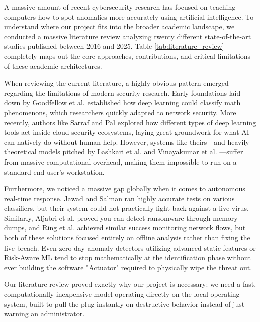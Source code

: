 \documentclass[conference]{IEEEtran}
\begin{document}
A massive amount of recent cybersecurity research has focused on teaching computers how to spot anomalies more accurately using artificial intelligence. To understand where our project fits into the broader academic landscape, we conducted a massive literature review analyzing twenty different state-of-the-art studies published between 2016 and 2025. Table \ref{tab:literature_review} completely maps out the core approaches, contributions, and critical limitations of these academic architectures.

When reviewing the current literature, a highly obvious pattern emerged regarding the limitations of modern security research. Early foundations laid down by Goodfellow et al. \cite{goodfellow2016deep} established how deep learning could classify math phenomenons, which researchers quickly adapted to network security. More recently, authors like Sarraf and Pal \cite{sarraf2025ai} explored how different types of deep learning tools act inside cloud security ecosystems, laying great groundwork for what AI can natively do without human help. However, systems like theirs—and heavily theoretical models pitched by Lashkari et al. \cite{lashkari2022deep} and Vinayakumar et al. \cite{vinayakumar2021deep}—suffer from massive computational overhead, making them impossible to run on a standard end-user's workstation. 

Furthermore, we noticed a massive gap globally when it comes to autonomous real-time response. Jawad and Salman \cite{jawad2024ml} ran highly accurate tests on various classifiers, but their system could not practically fight back against a live virus. Similarly, Aljabri et al. \cite{aljabri2024memory} proved you can detect ransomware through memory dumps, and Ring et al. \cite{ring2023flow} achieved similar success monitoring network flows, but both of these solutions focused entirely on offline analysis rather than fixing the live breach. Even zero-day anomaly detectors utilizing advanced static features \cite{venckauskas2025zero} or Risk-Aware ML \cite{alhuwayshil2025risk} tend to stop mathematically at the identification phase without ever building the software "Actuator" required to physically wipe the threat out. 

Our literature review proved exactly why our project is necessary: we need a fast, computationally inexpensive model operating directly on the local operating system, built to pull the plug instantly on destructive behavior instead of just warning an administrator.
\end{document}
